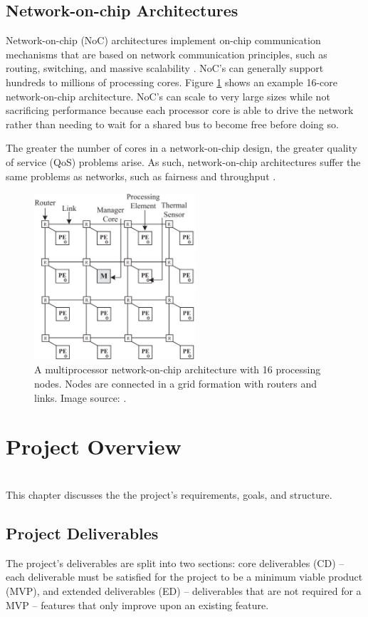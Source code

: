 \documentclass[11pt,a4paper]{report}
\begin{document}
{\section{Network-on-chip Architectures}
Network-on-chip (NoC) architectures implement on-chip communication mechanisms that are based on network communication  principles, such as routing, switching, and massive scalability \cite{newnoc}. NoC's can generally support hundreds to millions of processing cores.
Figure \ref{fig:noc} shows an example 16-core network-on-chip architecture. 
NoC's can scale to very large sizes while not sacrificing performance because each processor core is able to drive the network rather than needing to wait for a shared bus to become free before doing so.

The greater the number of cores in a network-on-chip design, the greater quality of service (QoS) problems arise. As such, network-on-chip architectures suffer the same problems as networks, such as fairness and throughput \cite{nocfairness}.


\begin{figure}[h]
\centering
\includegraphics[width=6cm]{../img/noc}
\caption{A multiprocessor network-on-chip architecture with 16 processing nodes. Nodes are connected in a grid formation with routers and links. Image source: \cite{noc}.}
\label{fig:noc}
\end{figure}

\chapter{Project Overview}
{%
\startcontents[chapters]
}
\noindent\\
This chapter discusses the the project's requirements, goals, and structure.

\section{Project Deliverables}
\label{sect:goals}
The project's deliverables are split into two sections: core deliverables (CD) -- each deliverable must be satisfied for the project to be a minimum viable product (MVP), and extended deliverables (ED) -- deliverables that are not required for a MVP -- features that only improve upon an existing feature.

}
\end{document}

